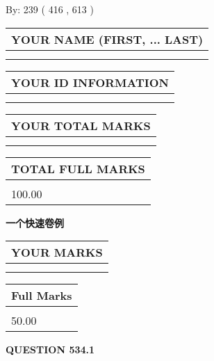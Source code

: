 \documentclass{ctexart}
\begin{document}
   
\hspace{1.0in} By: 
 239 ( 416 ,  613 )
   
   
   
   
\newpage 
\setcounter{page}{ 
   534001 } 
   
   
   
   
\noindent\begin{tabular}{|l|}
\hline
YOUR NAME (FIRST, ... LAST)  \\
\hline
 \\ 
 \\ 
\hline
\end{tabular}
\hspace{0.05in} \begin{tabular}{|l|}
\hline
 YOUR   ID   INFORMATION  \\
\hline
 \\ 
 \\ 
\hline
\end{tabular}
   
   
\vspace{0.2in}\noindent\begin{tabular}{|l|}
\hline
YOUR TOTAL MARKS  \\
\hline
 \\ 
 \\ 
\hline
\end{tabular}
\hspace{0.05in} \begin{tabular}{|l|}
\hline
TOTAL FULL MARKS  \\
\hline
 \\ 
100.00 \\
\hline
\end{tabular}
   
   
 \vspace{0.2in}
{\LARGE {\textbf{ 一个快速卷例}}}
   
   
  
\vspace{0.2in}
  
\noindent\begin{tabular}{|l|}
\hline
 YOUR MARKS  \\
\hline
 \\ 
 \\ 
\hline
\end{tabular}
\hspace{0.05in} \begin{tabular}{|l|}
\hline
 Full Marks  \\
\hline
 \\ 
50.00 \\
\hline
\end{tabular}
{\textbf{\Large{QUESTION
534.1 
}}}
  
\end{document}
